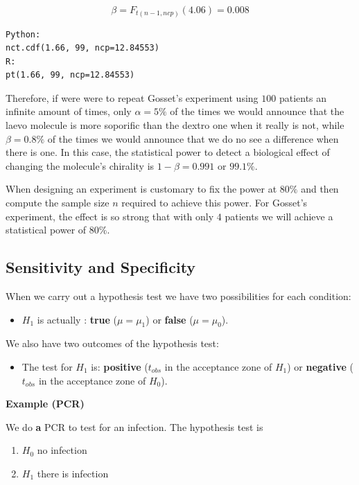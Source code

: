 \documentclass[
]{book}
\providecommand{\tightlist}{%
  \setlength{\itemsep}{0pt}\setlength{\parskip}{0pt}}
\begin{document}
\[\beta = F_{t(n-1, ncp)}(4.06)=0.008\]

\begin{verbatim}
Python:
nct.cdf(1.66, 99, ncp=12.84553)
R:
pt(1.66, 99, ncp=12.84553)
\end{verbatim}

Therefore, if were were to repeat Gosset's experiment using \(100\) patients an infinite amount of times, only \(\alpha=5\%\) of the times we would announce that the laevo molecule is more soporific than the dextro one when it really is not, while \(\beta=0.8\%\) of the times we would announce that we do no see a difference when there is one. In this case, the statistical power to detect a biological effect of changing the molecule's chirality is \(1-\beta=0.991\) or \(99.1\%\).

When designing an experiment is customary to fix the power at \(80\%\) and then compute the sample size \(n\) required to achieve this power. For Gosset's experiment, the effect is so strong that with only \(4\) patients we will achieve a statistical power of \(80\%\).

\hypertarget{sensitivity-and-specificity}{%
\subsection{Sensitivity and Specificity}\label{sensitivity-and-specificity}}

When we carry out a hypothesis test we have two possibilities for each condition:

\begin{itemize}
\tightlist
\item
  \(H_1\) is actually : \textbf{true} (\(\mu=\mu_1\)) or \textbf{false} (\(\mu=\mu_0\)).
\end{itemize}

We also have two outcomes of the hypothesis test:

\begin{itemize}
\tightlist
\item
  The test for \(H_1\) is: \textbf{positive} (\(t_{obs}\) in the acceptance zone of \(H_1\)) or \textbf{negative} (\(t_{obs}\) in the acceptance zone of \(H_0\)).
\end{itemize}

\textbf{Example (PCR)}

We do \textbf{a} PCR to test for an infection. The hypothesis test is

\begin{enumerate}
\def\labelenumi{\alph{enumi}.}
\tightlist
\item
  \(H_0\) no infection
\item
  \(H_1\) there is infection
\end{enumerate}
\end{document}
